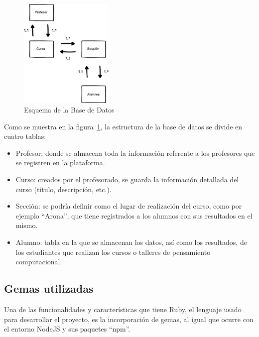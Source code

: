 \begin{figure}[!th]
\begin{center}
\includegraphics[width=0.4\textwidth]{images/base_de_datos.eps}
\caption{Esquema de la Base de Datos}
\label{fig:10}
\end{center}
\end{figure}

Como se muestra en la figura~\ref{fig:10}, la estructura de la base de datos se divide en cuatro tablas:

\begin{itemize}
    \item Profesor: donde se almacena toda la información referente a los profesores que se registren en la plataforma.
    \item Curso: creados por el profesorado, se guarda la información detallada del curso (título, descripción, etc.).
    \item Sección: se podría definir como el lugar de realización del curso, como por ejemplo ``Arona'', que tiene registrados a los alumnos con sus resultados en el mismo.
    \item Alumno: tabla en la que se almacenan los datos, así como los resultados, de los estudiantes que realizan los cursos o talleres de pensamiento computacional.
\end{itemize}


\subsection{Gemas utilizadas}
\label{1:sec:3}

Una de las funcionalidades y características que tiene Ruby, el lenguaje usado para desarrollar el proyecto, es la incorporación de gemas, al igual que ocurre con el entorno NodeJS y sus paquetes ``npm''.

